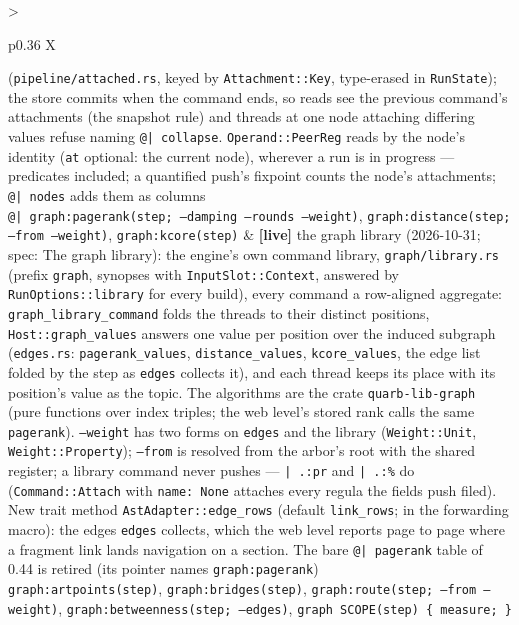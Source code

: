 \documentclass{report}
\newcommand{\live}{\textbf{\textcolor{blue!60!black}{[live]}}\xspace}
\begin{document}
\begin{xltabular}{\textwidth}{>{\raggedright\arraybackslash}p{0.36\textwidth} X}
    (\texttt{pipeline/attached.rs}, keyed by
    \texttt{Attachment::Key}, type-erased in \texttt{RunState});
    the store commits when the command ends, so reads see the
    previous command's attachments (the snapshot rule) and threads
    at one node attaching differing values refuse naming
    \texttt{@| collapse}. \texttt{Operand::PeerReg} reads by the
    node's identity (\texttt{at} optional: the current node),
    wherever a run is in progress --- predicates included; a
    quantified push's fixpoint counts the node's attachments;
    \texttt{@| nodes} adds them as columns \\
\texttt{@| graph:pagerank(step; --damping --rounds --weight)}, \texttt{graph:distance(step; --from --weight)}, \texttt{graph:kcore(step)}
  & \live the graph library (2026-10-31; spec: The graph library):
    the engine's own command library, \texttt{graph/library.rs}
    (prefix \texttt{graph}, synopses with \texttt{InputSlot::Context},
    answered by \texttt{RunOptions::library} for every build),
    every command a row-aligned aggregate:
    \texttt{graph\_library\_command} folds the threads to their
    distinct positions, \texttt{Host::graph\_values} answers one
    value per position over the induced subgraph
    (\texttt{edges.rs}: \texttt{pagerank\_values},
    \texttt{distance\_values}, \texttt{kcore\_values}, the edge list
    folded by the step as \texttt{edges} collects it), and each
    thread keeps its place with its position's value as the topic.
    The algorithms are the crate \texttt{quarb-lib-graph} (pure
    functions over index triples; the web level's stored rank calls
    the same \texttt{pagerank}). \texttt{--weight} has two forms on
    \texttt{edges} and the library (\texttt{Weight::Unit},
    \texttt{Weight::Property}); \texttt{--from} is resolved from the
    arbor's root with the shared register; a library command never
    pushes --- \texttt{| .:pr} and \texttt{| .:\%} do
    (\texttt{Command::Attach} with \texttt{name: None} attaches
    every regula the fields push filed). New trait method
    \texttt{AstAdapter::edge\_rows} (default \texttt{link\_rows}; in
    the forwarding macro): the edges \texttt{edges} collects, which
    the web level reports page to page where a fragment link lands
    navigation on a section. The bare \texttt{@| pagerank} table of
    0.44 is retired (its pointer names \texttt{graph:pagerank}) \\
\texttt{graph:artpoints(step)}, \texttt{graph:bridges(step)}, \texttt{graph:route(step; --from --weight)}, \texttt{graph:betweenness(step; --edges)}, \texttt{graph SCOPE(step) \{ measure; \}}

\end{xltabular}
\end{document}
